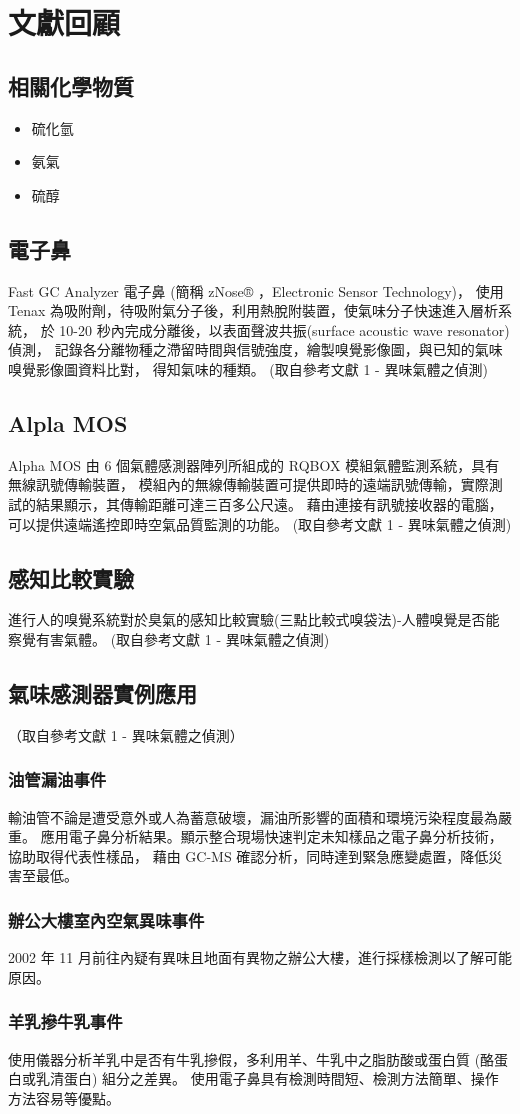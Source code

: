 \chapter{文獻回顧}

\section{相關化學物質}
\begin{itemize}
	\item 硫化氫
	\item 氨氣
	\item 硫醇
\end{itemize}

\section{電子鼻}
Fast GC Analyzer 電子鼻 (簡稱 zNose® ，Electronic Sensor Technology)，
使用 Tenax 為吸附劑，待吸附氣分子後，利用熱脫附裝置，使氣味分子快速進入層析系統，
於 10-20 秒內完成分離後，以表面聲波共振(surface acoustic wave resonator) 偵測，
記錄各分離物種之滯留時間與信號強度，繪製嗅覺影像圖，與已知的氣味嗅覺影像圖資料比對，
得知氣味的種類。 (取自參考文獻 1 - 異味氣體之偵測) 

\section{Alpla MOS}
Alpha MOS 由 6 個氣體感測器陣列所組成的 RQBOX 模組氣體監測系統，具有無線訊號傳輸裝置，
模組內的無線傳輸裝置可提供即時的遠端訊號傳輸，實際測試的結果顯示，其傳輸距離可達三百多公尺遠。
藉由連接有訊號接收器的電腦，可以提供遠端遙控即時空氣品質監測的功能。
(取自參考文獻 1 - 異味氣體之偵測) 

\section{感知比較實驗}
進行人的嗅覺系統對於臭氣的感知比較實驗(三點比較式嗅袋法)-人體嗅覺是否能察覺有害氣體。
(取自參考文獻 1 - 異味氣體之偵測) 

\section{氣味感測器實例應用}
（取自參考文獻 1 - 異味氣體之偵測）\\
	\subsection{油管漏油事件}
	輸油管不論是遭受意外或人為蓄意破壞，漏油所影響的面積和環境污染程度最為嚴重。
	應用電子鼻分析結果。顯示整合現場快速判定未知樣品之電子鼻分析技術，協助取得代表性樣品，
	藉由 GC-MS 確認分析，同時達到緊急應變處置，降低災害至最低。
	\subsection{辦公大樓室內空氣異味事件}
	2002 年 11 月前往內疑有異味且地面有異物之辦公大樓，進行採樣檢測以了解可能原因。
	\subsection{羊乳摻牛乳事件}
	使用儀器分析羊乳中是否有牛乳摻假，多利用羊、牛乳中之脂肪酸或蛋白質 (酪蛋白或乳清蛋白) 組分之差異。
	使用電子鼻具有檢測時間短、檢測方法簡單、操作方法容易等優點。 